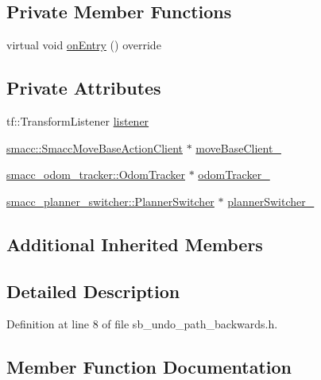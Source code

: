 \subsection*{Private Member Functions}
\begin{DoxyCompactItemize}
\item 
virtual void \hyperlink{classSbUndoPathBackwards_ab7eed4fa4633235b877758bd787bbea1}{on\+Entry} () override
\end{DoxyCompactItemize}
\subsection*{Private Attributes}
\begin{DoxyCompactItemize}
\item 
tf\+::\+Transform\+Listener \hyperlink{classSbUndoPathBackwards_ad341922358ca111e8bea86a2f94a1f5c}{listener}
\item 
\hyperlink{classsmacc_1_1SmaccMoveBaseActionClient}{smacc\+::\+Smacc\+Move\+Base\+Action\+Client} $\ast$ \hyperlink{classSbUndoPathBackwards_ad201bd8837a54bd7df0efc8d72fdb151}{move\+Base\+Client\+\_\+}
\item 
\hyperlink{classsmacc__odom__tracker_1_1OdomTracker}{smacc\+\_\+odom\+\_\+tracker\+::\+Odom\+Tracker} $\ast$ \hyperlink{classSbUndoPathBackwards_a4e543595d070980fb5cb621232904048}{odom\+Tracker\+\_\+}
\item 
\hyperlink{classsmacc__planner__switcher_1_1PlannerSwitcher}{smacc\+\_\+planner\+\_\+switcher\+::\+Planner\+Switcher} $\ast$ \hyperlink{classSbUndoPathBackwards_a881b1b8e6bcab14d59e26c09aaa3c7c0}{planner\+Switcher\+\_\+}
\end{DoxyCompactItemize}
\subsection*{Additional Inherited Members}


\subsection{Detailed Description}


Definition at line 8 of file sb\+\_\+undo\+\_\+path\+\_\+backwards.\+h.



\subsection{Member Function Documentation}
